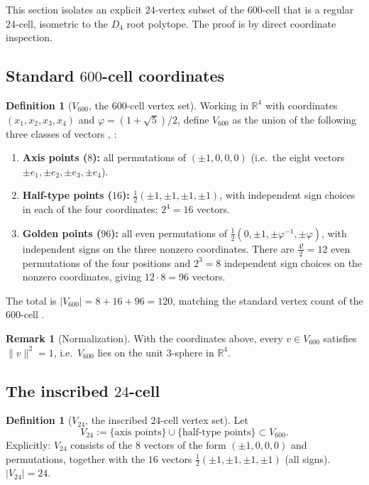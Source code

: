 \documentclass[11pt, a4paper]{amsart}
\theoremstyle{definition}
\newtheorem{definition}[theorem]{Definition}
\newtheorem{remark}[theorem]{Remark}
\newcommand{\R}{\mathbb{R}}
\begin{document}
This section isolates an explicit $24$-vertex subset of the
$600$-cell that is a regular $24$-cell, isometric to the $D_4$ root
polytope. The proof is by direct coordinate inspection.

\subsection{Standard $600$-cell coordinates}

\begin{definition}[$V_{600}$, the $600$-cell vertex set]
\label{def:V600}
Working in $\R^4$ with coordinates $(x_1, x_2, x_3, x_4)$ and
$\varphi = (1+\sqrt 5)/2$, define $V_{600}$ as the union of the
following three classes of vectors
\cite[\S 22.7]{CoxeterRegularPolytopes}, \cite[\S 3.1]{MoodyPatera}:
\begin{enumerate}
\item \textbf{Axis points ($8$):}
  all permutations of $(\pm 1, 0, 0, 0)$ (i.e.\ the eight vectors
  $\pm e_1, \pm e_2, \pm e_3, \pm e_4$).
\item \textbf{Half-type points ($16$):}
  $\frac{1}{2}(\pm 1, \pm 1, \pm 1, \pm 1)$, with independent sign
  choices in each of the four coordinates; $2^4 = 16$ vectors.
\item \textbf{Golden points ($96$):}
  all even permutations of
  $\tfrac{1}{2}(0, \pm 1, \pm \varphi^{-1}, \pm \varphi)$, with
  independent signs on the three nonzero coordinates. There are
  $\tfrac{4!}{2} = 12$ even permutations of the four positions and
  $2^3 = 8$ independent sign choices on the nonzero coordinates,
  giving $12 \cdot 8 = 96$ vectors.
\end{enumerate}
The total is $|V_{600}| = 8 + 16 + 96 = 120$, matching the standard
vertex count of the $600$-cell \cite[\S 22.7]{CoxeterRegularPolytopes}.
\end{definition}

\begin{remark}[Normalization]
With the coordinates above, every $v \in V_{600}$ satisfies
$\|v\|^2 = 1$, i.e.\ $V_{600}$ lies on the unit $3$-sphere in $\R^4$.
\end{remark}

\subsection{The inscribed $24$-cell}

\begin{definition}[$V_{24}$, the inscribed $24$-cell vertex set]
\label{def:V24}
Let
\[
  V_{24} := \big\{\text{axis points}\big\}
    \cup \big\{\text{half-type points}\big\} \subset V_{600}.
\]
Explicitly: $V_{24}$ consists of the $8$ vectors of the form
$(\pm 1, 0, 0, 0)$ and permutations, together with the $16$
vectors $\frac{1}{2}(\pm 1, \pm 1, \pm 1, \pm 1)$ (all signs).
$|V_{24}| = 24$.
\end{definition}
\end{document}
